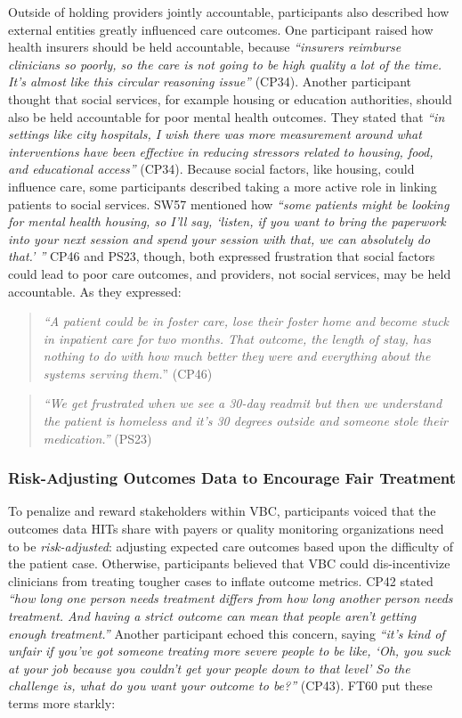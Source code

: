 Outside of holding providers jointly accountable, participants also described how external entities greatly influenced care outcomes.
One participant raised how health insurers should be held accountable, because \textit{``insurers reimburse clinicians so poorly, so the care is not going to be high quality a lot of the time. It's almost like this circular reasoning issue''} (CP34).
Another participant thought that social services, for example housing or education authorities, should also be held accountable for poor mental health outcomes.
They stated that \textit{``in settings like city hospitals, I wish there was more measurement around what interventions have been effective in reducing stressors related to housing, food, and educational access''} (CP34).
Because social factors, like housing, could influence care, some participants described taking a more active role in linking patients to social services.
SW57 mentioned how \textit{``some patients might be looking for mental health housing, so I'll say, `listen, if you want to bring the paperwork into your next session and spend your session with that, we can absolutely do that.' ''}
CP46 and PS23, though, both expressed frustration that social factors could lead to poor care outcomes, and providers, not social services, may be held accountable.
As they expressed:

\begin{quote}
    \textit{``A patient could be in foster care, lose their foster home and become stuck in inpatient care for two months. That outcome, the length of stay, has nothing to do with how much better they were and everything about the systems serving them.}'' (CP46)
\end{quote}

\begin{quote}
    \textit{``We get frustrated when we see a 30-day readmit but then we understand the patient is homeless and it's 30 degrees outside and someone stole their medication.''} (PS23)
\end{quote}

\subsubsection{Risk-Adjusting Outcomes Data to Encourage Fair Treatment}
\label{sec:findings:action:risk-adjustment}

To penalize and reward stakeholders within VBC, participants voiced that the outcomes data HITs share with payers or quality monitoring organizations need to be \textit{risk-adjusted}: adjusting expected care outcomes based upon the difficulty of the patient case.
Otherwise, participants believed that VBC could dis-incentivize clinicians from treating tougher cases to inflate outcome metrics.
CP42 stated \textit{``how long one person needs treatment differs from how long another person needs treatment. And having a strict outcome can mean that people aren't getting enough treatment.''}
Another participant echoed this concern, saying \textit{``it's kind of unfair if you've got someone treating more severe people to be like, `Oh, you suck at your job because you couldn't get your people down to that level' So the challenge is, what do you want your outcome to be?''} (CP43).
FT60 put these terms more starkly:


